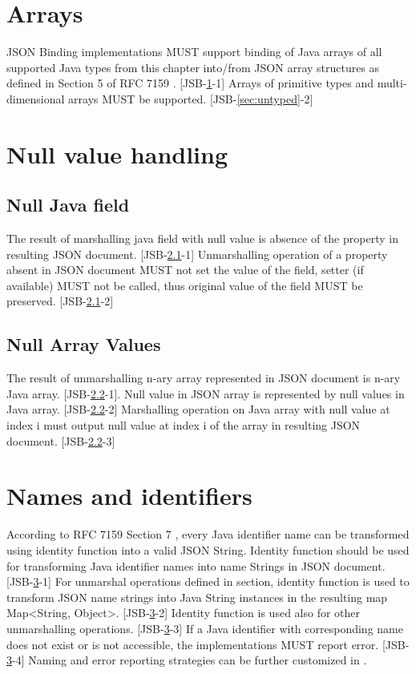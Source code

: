\section{Arrays}
\label{sec:arrays}
JSON Binding implementations MUST support binding of Java arrays of all supported Java types from this chapter into/from JSON array structures as defined in Section 5 of RFC 7159 \cite{rfc7159}. [JSB-\ref{sec:arrays}-1] Arrays of primitive types and multi-dimensional arrays MUST be supported. [JSB-\ref{sec:untyped}-2]

\section{Null value handling}
\label{sec:null}

\subsection{Null Java field}
\label{subsec:nullfield}
The result of marshalling java field with null value is absence of the property in resulting JSON document. [JSB-\ref{subsec:nullfield}-1]
Unmarshalling operation of a property absent in JSON document MUST not set the value of the field, setter (if available) MUST not be called, thus original value of the field MUST be preserved. [JSB-\ref{subsec:nullfield}-2]

\subsection{Null Array Values}
\label{subsec:nullarray}
The result of unmarshalling n-ary array represented in JSON document is n-ary Java array. [JSB-\ref{subsec:nullarray}-1]. Null value in JSON array is represented by null values in Java array. [JSB-\ref{subsec:nullarray}-2]
Marshalling operation on Java array with null value at index i must output null value at index i of the array in resulting JSON document. [JSB-\ref{subsec:nullarray}-3]

\section{Names and identifiers}
\label{sec:naming}
According to RFC 7159 Section 7 \cite{rfc7159}, every Java identifier name can be transformed using identity function into a valid JSON String. Identity function should be used for transforming Java identifier names into name Strings in JSON document. [JSB-\ref{sec:naming}-1]
For unmarshal operations defined in  section, identity function is used to transform JSON name strings into Java String instances in the resulting map Map<String, Object>. [JSB-\ref{sec:naming}-2] Identity function is used also for other unmarshalling operations. [JSB-\ref{sec:naming}-3] If a Java identifier with corresponding name does not exist or is not accessible, the implementations MUST report error. [JSB-\ref{sec:naming}-4] Naming and error reporting strategies can be further customized in .

